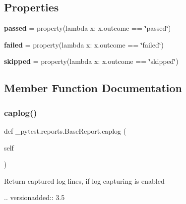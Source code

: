 \subsection*{Properties}
\begin{DoxyCompactItemize}
\item 
\mbox{\label{class__pytest_1_1reports_1_1_base_report_a6fbd6fbd2dbdc7cb64c760209c3e5e7d}} 
{\bfseries passed} = property(lambda x\+: x.\+outcome == \char`\"{}passed\char`\"{})
\item 
\mbox{\label{class__pytest_1_1reports_1_1_base_report_a19b73bc49eef4454bd96397c787a1122}} 
{\bfseries failed} = property(lambda x\+: x.\+outcome == \char`\"{}failed\char`\"{})
\item 
\mbox{\label{class__pytest_1_1reports_1_1_base_report_a26b9f729a4572b1b07b53366337a99b1}} 
{\bfseries skipped} = property(lambda x\+: x.\+outcome == \char`\"{}skipped\char`\"{})
\end{DoxyCompactItemize}


\subsection{Member Function Documentation}
\mbox{\label{class__pytest_1_1reports_1_1_base_report_a1c08aee6793feac67390e36cf3d183fb}} 
\subsubsection{\texorpdfstring{caplog()}{caplog()}}
{\footnotesize\ttfamily def \+\_\+pytest.\+reports.\+Base\+Report.\+caplog (\begin{DoxyParamCaption}\item[{}]{self }\end{DoxyParamCaption})}

\begin{DoxyVerb}Return captured log lines, if log capturing is enabled

.. versionadded:: 3.5
\end{DoxyVerb}
 \mbox{\label{class__pytest_1_1reports_1_1_base_report_af64206622f73f444e79e96cb5918499f}} 
